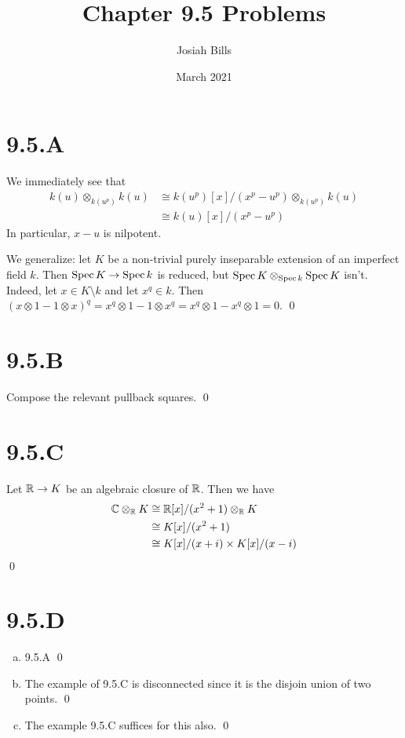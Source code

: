 \documentclass{article}
\title{Chapter 9.5 Problems}
\author{Josiah Bills}
\date{March 2021}
\begin{document}
\maketitle

\section{9.5.A}
We immediately see that
\begin{align*}
    k(u) \otimes_{k(u^p)} k(u) & \cong k(u^p)[x]/(x^p-u^p) \otimes_{k(u^p)} k(u) \\
                               & \cong k(u)[x]/(x^p-u^p)
\end{align*}
In particular, $x-u$ is nilpotent.

We generalize: let $K$ be a non-trivial purely inseparable
extension of an imperfect field $k$. Then
$\operatorname{Spec} K \to \operatorname{Spec} k$ is reduced, but $\operatorname{Spec} K \otimes_{\operatorname{Spec} k} \operatorname{Spec} K$ isn't. Indeed,
let $x \in K \setminus k$ and let $x^q \in k$. Then
$(x \otimes 1 - 1 \otimes x)^q=x^q \otimes 1 - 1 \otimes x^q=x^q\otimes 1 - x^q
    \otimes 1 = 0$. \qed

\section{9.5.B}
Compose the relevant pullback squares. \qed

\section{9.5.C}
Let $\mathbb{R} \to K$ be an algebraic closure of $\mathbb{R}$.
Then we have
\begin{align*}
    \mathbb{C} \otimes_{\mathbb{R}} K & \cong \mathbb{R}[x]/(x^2+1) \otimes_{\mathbb{R}} K \\
                      & \cong K[x]/(x^2+1)                 \\
                      & \cong K[x]/(x+i) \times K[x]/(x-i)
\end{align*}
\qed

\section{9.5.D}
\begin{enumerate}[a.]
    \item 9.5.A \qed
    \item The example of 9.5.C is disconnected since it is the disjoin union of two
          points. \qed
    \item The example 9.5.C suffices for this also. \qed
\end{enumerate}
\end{document}
